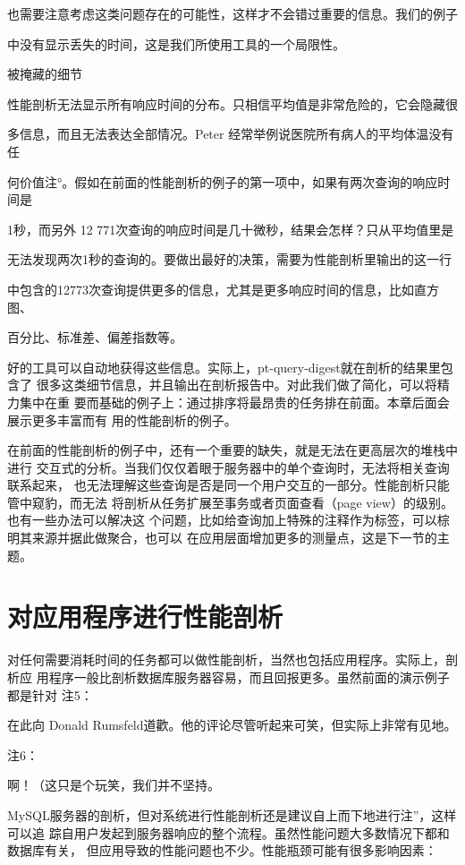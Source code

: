 也需要注意考虑这类问题存在的可能性，这样才不会错过重要的信息。我们的例子

中没有显示丢失的时间，这是我们所使用工具的一个局限性。

被掩藏的细节

性能剖析无法显示所有响应时间的分布。只相信平均值是非常危险的，它会隐藏很

多信息，而且无法表达全部情况。Peter 经常举例说医院所有病人的平均体温没有任

何价值注°。假如在前面的性能剖析的例子的第一项中，如果有两次查询的响应时间是

1秒，而另外 12 771次查询的响应时间是几十微秒，结果会怎样？只从平均值里是

无法发现两次1秒的查询的。要做出最好的决策，需要为性能剖析里输出的这一行

中包含的12773次查询提供更多的信息，尤其是更多响应时间的信息，比如直方图、

百分比、标准差、偏差指数等。

好的工具可以自动地获得这些信息。实际上，pt-query-digest就在剖析的结果里包含了
很多这类细节信息，并且输出在剖析报告中。对此我们做了简化，可以将精力集中在重
要而基础的例子上：通过排序将最昂贵的任务排在前面。本章后面会展示更多丰富而有
用的性能剖析的例子。

在前面的性能剖析的例子中，还有一个重要的缺失，就是无法在更高层次的堆栈中进行
交互式的分析。当我们仅仅着眼于服务器中的单个查询时，无法将相关查询联系起来，
也无法理解这些查询是否是同一个用户交互的一部分。性能剖析只能管中窥豹，而无法
将剖析从任务扩展至事务或者页面查看（page view）的级别。也有一些办法可以解决这
个问题，比如给查询加上特殊的注释作为标签，可以棕明其来源并据此做聚合，也可以
在应用层面增加更多的测量点，这是下一节的主题。

\section{对应用程序进行性能剖析}
对任何需要消耗时间的任务都可以做性能剖析，当然也包括应用程序。实际上，剖析应
用程序一般比剖析数据库服务器容易，而且回报更多。虽然前面的演示例子都是针对
注5：

在此向 Donald Rumsfeld道歡。他的评论尽管听起来可笑，但实际上非常有见地。

注6：

啊！（这只是个玩笑，我们并不坚持。

MySQL服务器的剖析，但对系统进行性能剖析还是建议自上而下地进行注”，这样可以追
踪自用户发起到服务器响应的整个流程。虽然性能问题大多数情况下都和数据库有关，
但应用导致的性能问题也不少。性能瓶颈可能有很多影响因素：

